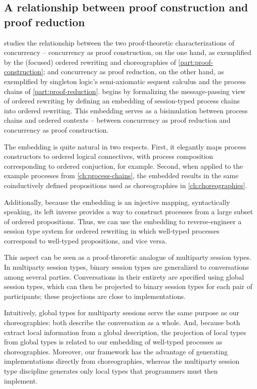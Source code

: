 \subsection{A relationship between proof construction and proof reduction}

 studies the relationship between the two proof-theoretic characterizations of concurrency -- concurrency as proof construction, on the one hand, as exemplified by the (focused) ordered rewriting and choreographies of \cref{part:proof-construction}; and concurrency as proof reduction, on the other hand, as exemplified by singleton logic's semi-axiomatic sequent calculus and the process chains of \cref{part:proof-reduction}.
 begins by formalizing the message-passing view of ordered rewriting by defining an embedding of session-typed process chains into ordered rewriting.
This embedding serves as a bisimulation between process chains and ordered contexts -- between concurrency as proof reduction and concurrency as proof construction.

The embedding is quite natural in two respects.  
First, it elegantly maps process constructors to ordered logical connectives, with process composition corresponding to ordered conjuction, for example.
Second, when applied to the example processes from \cref{ch:process-chains}, the embedded results in the same coinductively defined propositions used as choreographies in \cref{ch:choreographies}.

Additionally, because the embedding is an injective mapping, syntactically speaking, its left inverse provides a way to construct processes from a large subset of ordered propositions.
Thus, we can use the embedding to reverse-engineer a session type system for ordered rewriting in which well-typed processes correspond to well-typed propositions, and vice versa.


This aspect can be seen as a proof-theoretic analogue of multiparty session types.\autocite{Honda+:POPL08}
In multiparty session types, binary session types are generalized to conversations among several parties.
Conversations in their entirety are specified using global session types, which can then be projected to binary session types for each pair of participants; these projections are close to implementations.

Intuitively, global types for multiparty sessions serve the same purpose as our choreographies: both describe the conversation as a whole.
And, because both extract local information from a global description, the projection of local types from global types is related to our embedding of well-typed processes as choreographies.
Moreover, our framework has the advantage of generating implementations directly from choreographies, whereas the multiparty session type discipline generates only local types that programmers must then implement.


